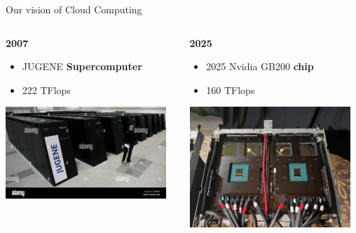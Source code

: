 \documentclass[10pt,aspectratio=1609]{beamer}
\begin{document}
\begin{section}{Our vision of Cloud Computing}
\begin{frame}
  \begin{columns}[T] %
    \begin{column}{0.5\textwidth}
      \textbf{2007}
      \begin{itemize}
        \item JUGENE \textbf{Supercomputer}
        \item 222 TFlops
      \end{itemize}
      \includegraphics[width=0.95\textwidth]{supercomputer-jugene.jpg}
    \end{column}
    \begin{column}{0.5\textwidth}
      \textbf{2025}
      \begin{itemize}
        \item 2025 Nvidia GB200 \textbf{chip}
        \item 160 TFlops

      \end{itemize}
      \includegraphics[width=0.95\textwidth]{chip-gb200.png}
    \end{column}
  \end{columns}


\end{frame}
\end{section}
\end{document}
